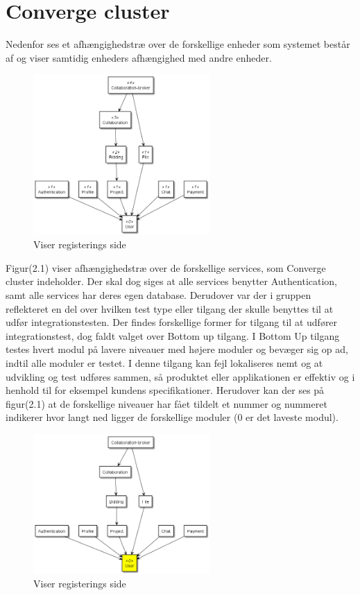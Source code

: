 \chapter{Converge cluster}

Nedenfor ses et afhængighedstræ over de forskellige enheder som systemet består af og viser samtidig enheders afhængighed med andre enheder.

\begin{figure}[ht]
    \centering
\includegraphics[width=0.6\textwidth]{integrationstest-image/step_0_dependencieTree.png}
\caption{Viser registerings side}
\label{fig:figure2}
\end{figure}


Figur(2.1) viser afhængighedstræ over de forskellige services, som Converge cluster indeholder. Der skal dog siges at alle services benytter Authentication, samt alle services har deres egen database.
Derudover var der i gruppen reflekteret en del over hvilken test type eller tilgang der skulle benyttes til at udfør integrationstesten. Der findes forskellige former for tilgang til at udfører integrationstest, dog faldt valget over Bottom up tilgang. I Bottom Up tilgang testes hvert modul på lavere niveauer med højere moduler og bevæger sig op ad, indtil alle moduler er testet. I denne tilgang kan fejl lokaliseres nemt og at udvikling og test udføres sammen, så produktet eller applikationen er effektiv og i henhold til for eksempel kundens specifikationer. 
Herudover kan der ses på figur(2.1) at de forskellige niveauer har fået tildelt et nummer og nummeret indikerer hvor langt ned ligger de forskellige moduler (0 er det laveste modul). 

\newpage


\begin{figure}[ht]
    \centering
\includegraphics[width=0.6\textwidth]{integrationstest-image/step_1_dependencieTree.png}
\caption{Viser registerings side}
\label{fig:figure2}
\end{figure}


